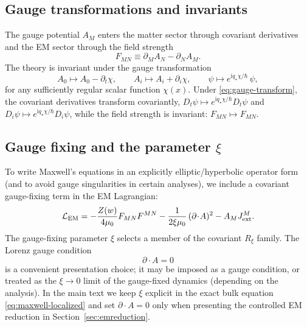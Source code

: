 \documentclass[11pt]{article}
\newcommand{\ii}{\mathrm{i}}
\newcommand{\qstar}{q_\star}
\begin{document}
\subsection{Gauge transformations and invariants}
\label{app:gauge-transform}

The gauge potential $A_M$ enters the matter sector through covariant derivatives and the EM sector through the field strength
\begin{equation}
F_{MN} \equiv \partial_M A_N - \partial_N A_M.
\end{equation}
The theory is invariant under the gauge transformation
\begin{equation}
A_0 \mapsto A_0 - \partial_t \chi,
\qquad
A_i \mapsto A_i + \partial_i \chi,
\qquad
\psi \mapsto e^{\ii \qstar \chi/\hbar}\,\psi,
\label{eq:gauge-transform}
\end{equation}
for any sufficiently regular scalar function $\chi(x)$. Under \eqref{eq:gauge-transform}, the covariant derivatives transform covariantly, $D_t\psi \mapsto e^{\ii \qstar \chi/\hbar} D_t\psi$ and $D_i\psi \mapsto e^{\ii \qstar \chi/\hbar} D_i\psi$, while the field strength is invariant: $F_{MN}\mapsto F_{MN}$.

\subsection{Gauge fixing and the parameter \texorpdfstring{$\xi$}{xi}}
\label{app:gauge-fixing}

To write Maxwell's equations in an explicitly elliptic/hyperbolic operator form (and to avoid gauge singularities in certain analyses), we include a covariant gauge-fixing term in the EM Lagrangian:
\begin{equation}
\mathcal L_{\rm EM}
=
-\frac{Z(w)}{4\mu_0}F_{MN}F^{MN}
-\frac{1}{2\xi\mu_0}\,(\partial\!\cdot\!A)^2
- A_M J_{\rm ext}^M.
\end{equation}
The gauge-fixing parameter $\xi$ selects a member of the covariant $R_\xi$ family. The Lorenz gauge condition
\begin{equation}
\partial\!\cdot\!A = 0
\label{eq:lorenz-gauge-app}
\end{equation}
is a convenient presentation choice; it may be imposed as a gauge condition, or treated as the $\xi\to 0$ limit of the gauge-fixed dynamics (depending on the analysis). In the main text we keep $\xi$ explicit in the exact bulk equation \eqref{eq:maxwell-localized} and set $\partial\!\cdot\!A=0$ only when presenting the controlled EM reduction in Section~\ref{sec:emreduction}.
\end{document}
